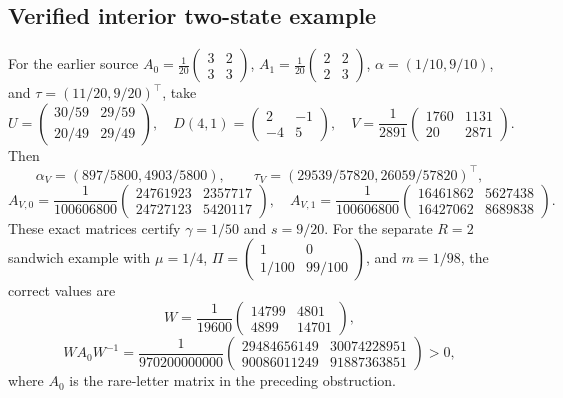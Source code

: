 \subsection{Verified interior two-state example}
For the earlier source
$A_0=\frac1{20}\left(\begin{smallmatrix}3&2\\3&3\end{smallmatrix}\right)$,
$A_1=\frac1{20}\left(\begin{smallmatrix}2&2\\2&3\end{smallmatrix}\right)$,
$\alpha=(1/10,9/10)$, and $\tau=(11/20,9/20)^\top$, take
\[
 U=\begin{pmatrix}30/59&29/59\\20/49&29/49\end{pmatrix},\quad
 D(4,1)=\begin{pmatrix}2&-1\\-4&5\end{pmatrix},\quad
 V=\frac1{2891}\begin{pmatrix}1760&1131\\20&2871\end{pmatrix}.
\]
Then
\[
 \alpha_V=(897/5800,4903/5800),\qquad
 \tau_V=(29539/57820,26059/57820)^\top,
\]
\[
 A_{V,0}=\frac1{100606800}
       \begin{pmatrix}24761923&2357717\\24727123&5420117\end{pmatrix},
 \quad
 A_{V,1}=\frac1{100606800}
       \begin{pmatrix}16461862&5627438\\16427062&8689838\end{pmatrix}.
\]
These exact matrices certify $\gamma=1/50$ and $s=9/20$.
For the separate $R=2$ sandwich example with
$\mu=1/4$, $\Pi=\left(\begin{smallmatrix}1&0\\1/100&99/100\end{smallmatrix}\right)$,
and $m=1/98$, the correct values are
\[
 W=\frac1{19600}\begin{pmatrix}14799&4801\\4899&14701\end{pmatrix},
\]
\[
 WA_0W^{-1}=\frac1{970200000000}
       \begin{pmatrix}29484656149&30074228951\\
                       90086011249&91887363851\end{pmatrix}>0,
\]
where $A_0$ is the rare-letter matrix in the preceding obstruction.

